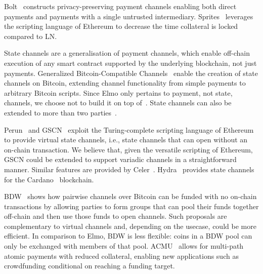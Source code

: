   Bolt~\cite{10.1145/3133956.3134093} constructs privacy-preserving payment
  channels enabling both direct payments and payments with a single untrusted
  intermediary. Sprites~\cite{sprites} leverages the scripting language of
  E\-the\-re\-um to decrease the time collateral is locked compared to LN.

  State channels are a generalisation of payment channels, which enable
  off-chain execution of any smart contract supported by the underlying
  blockchain, not just payments. Generalized Bitcoin-Compatible
  Channels~\cite{DBLP:journals/iacr/AumayrEEFHMMR20} enable the creation of
  state channels on Bitcoin, extending channel functionality from simple
  payments to arbitrary Bitcoin scripts. Since Elmo only pertains to payment,
  not state, channels, we choose not to build it on top
  of~\cite{DBLP:journals/iacr/AumayrEEFHMMR20}. State channels can also be
  extended to more than two
  parties~\cite{DBLP:conf/asiaccs/LiaoZSS22,DBLP:conf/eurocrypt/DziembowskiEFHH19}.

  Perun~\cite{perun} and GSCN~\cite{DBLP:conf/ccs/DziembowskiFH18} exploit the
  Turing-complete scripting language of Ethereum to provide virtual state
  channels, i.e., state channels that can open without an on-chain transaction.
  We believe that, given the versatile scripting of Ethereum, GSCN could be
  extended to support variadic channels in a straightforward manner. Similar
  features are provided by Celer~\cite{dong2018celer}.
  Hydra~\cite{cryptoeprint:2020:299} provides state channels for the
  Cardano~\cite{cardano} blockchain.

  BDW~\cite{scalable-funding} shows how pairwise channels over Bitcoin can be
  funded with no on-chain transactions by allowing parties to form groups that
  can pool their funds together off-chain and then use those funds to open
  channels. Such proposals are complementary to virtual channels and, depending
  on the usecase, could be more efficient. In comparison to Elmo, BDW is less
  flexible: coins in a BDW pool can only be exchanged with members of that
  pool. ACMU~\cite{10.1145/3319535.3345666} allows for multi-path atomic
  payments with reduced collateral, enabling new applications such as
  crowdfunding conditional on reaching a funding target.

